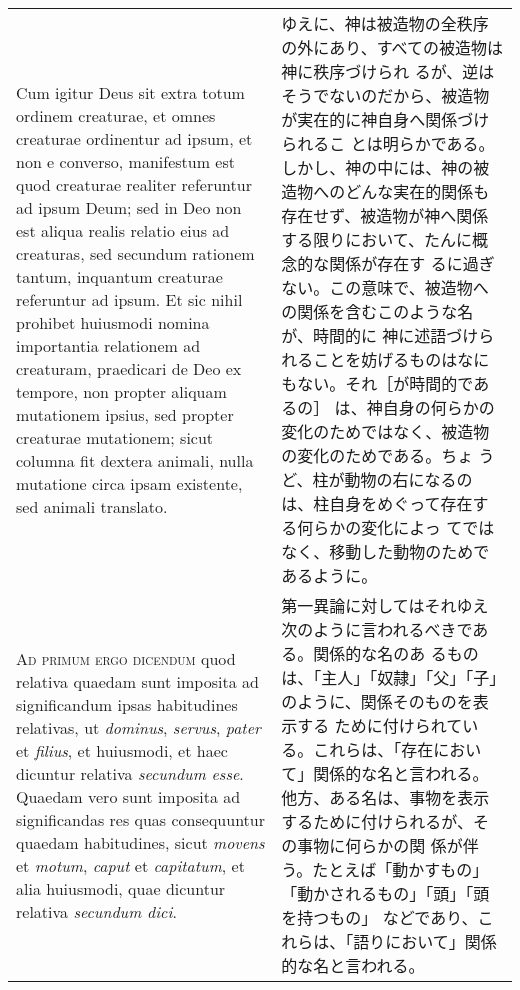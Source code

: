 \documentclass[paper=a4paper,fontsize=10pt,jafontsize=9pt,titlepage]{jlreq}
\begin{document}
\begin{longtable}{p{21em}p{21em}}
\\

Cum igitur Deus sit extra totum ordinem creaturae, et omnes creaturae
ordinentur ad ipsum, et non e converso, manifestum est quod creaturae
realiter referuntur ad ipsum Deum; sed in Deo non est aliqua realis
relatio eius ad creaturas, sed secundum rationem tantum, inquantum
creaturae referuntur ad ipsum. Et sic nihil prohibet huiusmodi nomina
importantia relationem ad creaturam, praedicari de Deo ex tempore, non
propter aliquam mutationem ipsius, sed propter creaturae mutationem;
sicut columna fit dextera animali, nulla mutatione circa ipsam
existente, sed animali translato.

&

ゆえに、神は被造物の全秩序の外にあり、すべての被造物は神に秩序づけられ
るが、逆はそうでないのだから、被造物が実在的に神自身へ関係づけられるこ
とは明らかである。しかし、神の中には、神の被造物へのどんな実在的関係も
存在せず、被造物が神へ関係する限りにおいて、たんに概念的な関係が存在す
るに過ぎない。この意味で、被造物への関係を含むこのような名が、時間的に
神に述語づけられることを妨げるものはなにもない。それ［が時間的であるの］
は、神自身の何らかの変化のためではなく、被造物の変化のためである。ちょ
うど、柱が動物の右になるのは、柱自身をめぐって存在する何らかの変化によっ
てではなく、移動した動物のためであるように。

\\

{\scshape Ad primum ergo dicendum} quod relativa quaedam sunt imposita
ad significandum ipsas habitudines relativas, ut {\itshape dominus},
{\itshape servus}, {\itshape pater} et {\itshape filius}, et
huiusmodi, et haec dicuntur relativa {\itshape secundum esse}. Quaedam
vero sunt imposita ad significandas res quas consequuntur quaedam
habitudines, sicut {\itshape movens} et {\itshape motum}, {\itshape
caput} et {\itshape capitatum}, et alia huiusmodi, quae dicuntur
relativa {\itshape secundum dici}.

&

第一異論に対してはそれゆえ次のように言われるべきである。関係的な名のあ
るものは、「主人」「奴隷」「父」「子」のように、関係そのものを表示する
ために付けられている。これらは、「存在において」関係的な名と言われる。
他方、ある名は、事物を表示するために付けられるが、その事物に何らかの関
係が伴う。たとえば「動かすもの」「動かされるもの」「頭」「頭を持つもの」
などであり、これらは、「語りにおいて」関係的な名と言われる。

\\


\end{longtable}
\end{document}
